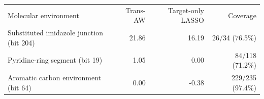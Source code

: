 \begin{tabular}{lrrr}
Molecular environment & Trans-AW & Target-only LASSO & Coverage \\
Substituted imidazole junction (bit 204) & 21.86 & 16.19 & 26/34 (76.5\%) \\
Pyridine-ring segment (bit 19) & 1.05 & 0.00 & 84/118 (71.2\%) \\
Aromatic carbon environment (bit 64) & 0.00 & -0.38 & 229/235 (97.4\%) \\
\end{tabular}
